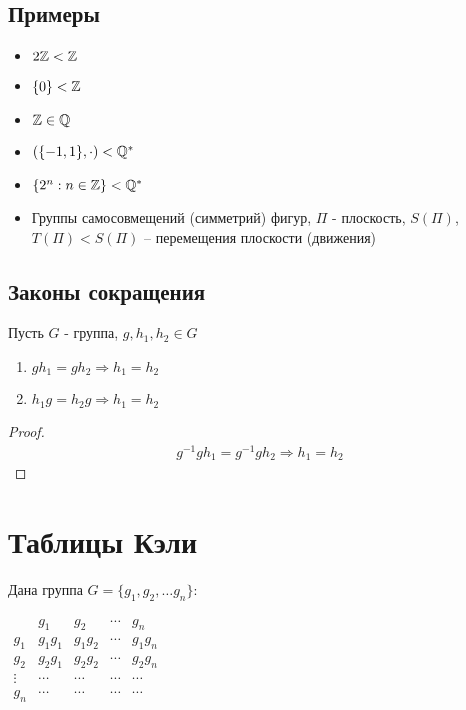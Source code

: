 \documentclass[main]{subfiles}
\begin{document}
\subsection{Примеры} \marginpar{$\subset \Leftrightarrow <$}
\begin{itemize}
    \item  $2\mathbb{Z} < \mathbb{Z}$
    \item $\{0\}< \mathbb{Z}$
    \item $\mathbb{Z} \in \mathbb{Q}$
    \item $(\{-1, 1\}, \cdot) < \mathbb{Q}^*$
    \item  $\{2^n: n \in \mathbb{Z}\} < \mathbb{Q}^*$
    \item Группы самосовмещений (симметрий) фигур, $\Pi$ - плоскость,
          $S(\Pi)$, $T(\Pi) < S(\Pi)$ -- перемещения плоскости (движения)
\end{itemize}

\subsection{Законы сокращения}
\begin{lemma}
    Пусть $G$ - группа, $g, h_1, h_2 \in G$

    \begin{enumerate}
        \item $gh_1 = gh_2 \Rightarrow h_1 = h_2$
        \item $h_1 g = h_2 g \Rightarrow h_1 = h_2$
    \end{enumerate}
\end{lemma}
\begin{proof}
    \begin{gather*}
        g^{-1}gh_1 = g^{-1}gh_2 \Rightarrow h_1 = h_2
    \end{gather*}
\end{proof}

\section{Таблицы Кэли}
Дана группа $G = \{g_1, g_2, \ldots g_n\}$:

\begin{center}
    $\begin{array}{c|cccc}
                   & g_1     & g_2     & \cdots & g_n     \\
            \hline
            g_1    & g_1 g_1 & g_1 g_2 & \cdots & g_1 g_n \\
            g_2    & g_2 g_1 & g_2 g_2 & \cdots & g_2 g_n \\
            \vdots & \cdots  & \cdots  & \cdots & \cdots  \\
            g_n    & \cdots  & \cdots  & \cdots & \cdots
        \end{array}$
\end{center}
\end{document}
